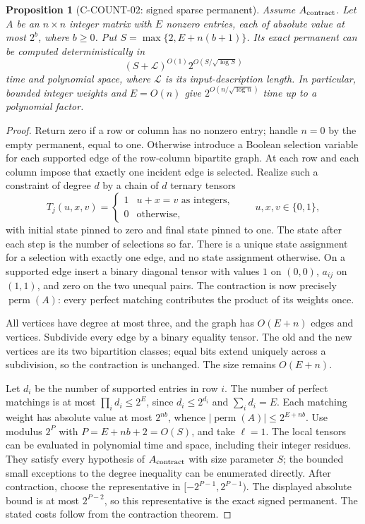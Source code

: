 \documentclass[11pt,a4paper]{article}
\newtheorem{proposition}{Proposition}[section]
\begin{document}
\begin{proposition}[C-COUNT-02: signed sparse permanent]
Assume \(A_{\rm contract}\).  Let \(A\) be an \(n\times n\) integer
matrix with \(E\) nonzero entries, each of absolute value at most \(2^b\),
where \(b\ge0\).  Put \(S=\max\{2,E+n(b+1)\}\).  Its exact permanent
can be computed deterministically in
\[
 (S+\mathcal L)^{O(1)}2^{O(S/\sqrt{\log S})}
\]
time and polynomial space, where \(\mathcal L\) is its input-description
length.  In particular, bounded integer weights and \(E=O(n)\) give
\(2^{O(n/\sqrt{\log n})}\) time up to a polynomial factor.
\end{proposition}
\begin{proof}
Return zero if a row or column has no nonzero entry; handle \(n=0\)
by the empty permanent, equal to one.  Otherwise introduce a Boolean
selection variable for each supported edge of the row-column bipartite
graph.  At each row and each column impose that exactly one incident
edge is selected.  Realize such a constraint of degree \(d\) by a chain
of \(d\) ternary tensors
\[
 T_j(u,x,v)=\begin{cases}1&u+x=v\text{ as integers},\\0&\text{otherwise},\end{cases}
 \qquad u,x,v\in\{0,1\},
\]
with initial state pinned to zero and final state pinned to one.
The state after each step is the number of selections so far.  There
is a unique state assignment for a selection with exactly one edge,
and no state assignment otherwise.  On a supported edge insert a
binary diagonal tensor with values \(1\) on \((0,0)\), \(a_{ij}\)
on \((1,1)\), and zero on the two unequal pairs.
The contraction is now precisely \(\operatorname{perm}(A)\): every
perfect matching contributes the product of its weights once.

All vertices have degree at most three, and the graph has \(O(E+n)\)
edges and vertices.  Subdivide every edge by a binary equality tensor.
The old and the new vertices are its two bipartition classes; equal
bits extend uniquely across a subdivision, so the contraction is
unchanged.  The size remains \(O(E+n)\).

Let \(d_i\) be the number of supported entries in row \(i\).  The
number of perfect matchings is at most \(\prod_i d_i\le2^E\), since
\(d_i\le2^{d_i}\) and \(\sum_i d_i=E\).  Each matching weight has
absolute value at most \(2^{nb}\), whence
\(|\operatorname{perm}(A)|\le2^{E+nb}\).
Use modulus \(2^P\) with \(P=E+nb+2=O(S)\), and take \(\ell=1\).
The local tensors can be evaluated in polynomial time and space,
including their integer residues.  They satisfy every hypothesis of
\(A_{\rm contract}\) with size parameter \(S\); the bounded small
exceptions to the degree inequality can be enumerated directly.
After contraction, choose the representative in
\([-2^{P-1},2^{P-1})\).  The displayed absolute bound is at most
\(2^{P-2}\), so this representative is the exact signed permanent.
The stated costs follow from the contraction theorem.
\end{proof}
\end{document}
